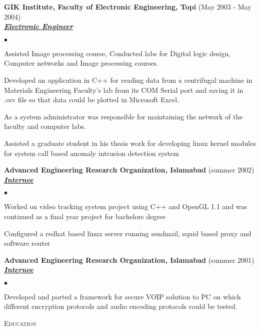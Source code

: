\documentclass{article}
\newcommand{\lineunder}{\vspace*{-8pt} \\ \hspace*{-18pt} \hrulefill \\}
\newcommand{\header}[1]{{\hspace*{-15pt}\vspace*{6pt} \textsc{#1}} \vspace*{-6pt} \lineunder}
\newcommand{\employer}[3]{{ \textbf{#1} (#2)\\ \underline{\textbf{\emph{#3}}}\\  }}
\newenvironment{achievements}{\begin{list}{$\bullet$}{\topsep 0pt \itemsep -2pt}}{\vspace*{4pt}\end{list}}
\begin{document}
\employer{GIK Institute, Faculty of Electronic Engineering, Topi}{May 2003 - May 2004}{Electronic Engineer}
	\begin{achievements}
	\item Assisted Image processing course, Conducted labs for Digital logic design, Computer networks and Image processing courses.
	\item Developed an application in C++ for reading data from a centrifugal machine in Materials Engineering Faculty’s lab from its COM Serial port and saving it in .csv file so that data could be plotted in Microsoft Excel.
	\item As a system administrator was responsible for maintaining the network of the faculty and computer labs.
	\item Assisted a graduate student in his thesis work for developing linux kernel modules for system call based anomaly intrusion detection system
	\end{achievements}

\employer{Advanced Engineering Research Organization, Islamabad}{summer 2002}{Internee}
	\begin{achievements}
	\item Worked on video tracking system project using C++ and OpenGL 1.1 and was continued as a final year project for bachelors degree
	\item Configured a redhat based linux server running sendmail, squid based proxy and software router
	\end{achievements}

\employer{Advanced Engineering Research Organization, Islamabad}{summer 2001}{Internee}
	\begin{achievements}
	\item Developed and ported a framework for secure VOIP solution to PC on which different encryption protocols and audio encoding protocols could be tested.
	\end{achievements}

\header{Education}
\end{document}
